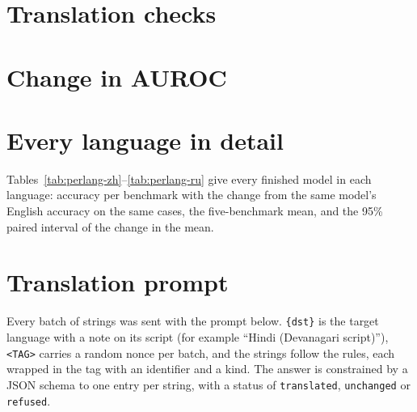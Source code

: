 \appendix

\section{Translation checks}
\label{app:excluded}



\section{Change in AUROC}



\section{Every language in detail}
\label{app:perlang}

Tables~\ref{tab:perlang-zh}--\ref{tab:perlang-ru} give every finished model in
each language: accuracy per benchmark with the change from the same model's
English accuracy on the same cases, the five-benchmark mean, and the 95\%
paired interval of the change in the mean.



\section{Translation prompt}
\label{app:prompt}

Every batch of strings was sent with the prompt below. \texttt{\{dst\}} is the
target language with a note on its script (for example ``Hindi (Devanagari
script)''), \texttt{<TAG>} carries a random nonce per batch, and
the strings follow the rules, each wrapped in the tag with an identifier and a
kind. The answer is constrained by a JSON schema to one entry per string, with
a status of \texttt{translated}, \texttt{unchanged} or \texttt{refused}.

